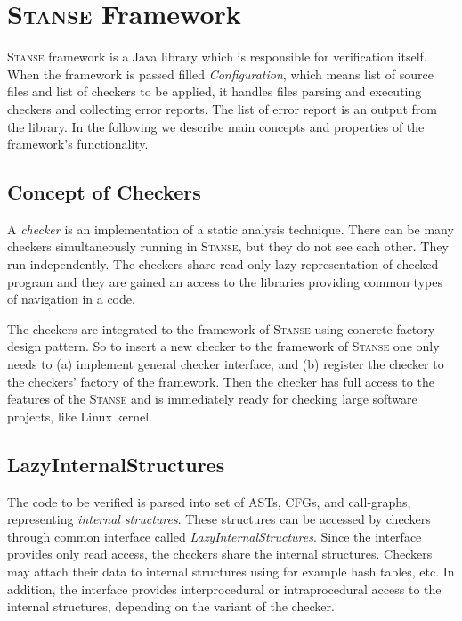 \documentclass[10pt]{llncs}
\newcommand{\Stanse}{\textsc{Stanse}\xspace}
\begin{document}
\section{\Stanse Framework}
\label{sec:framework}

\Stanse framework is a Java library which is responsible for verification itself. When the framework is passed filled \emph{Configuration}, which means list of source files and list of checkers to be applied, it handles files parsing and executing checkers and collecting error reports. The list of error report is an output from the library. In the following we describe main concepts and properties of the framework's functionality.

\subsection{Concept of Checkers}

A \emph{checker} is an implementation of a static analysis technique. There can be many checkers simultaneously running in \Stanse, but they do not see each other. They run independently. The checkers share read-only lazy representation of checked program and they are gained an access to the libraries providing common types of navigation in a code.

The checkers are integrated to the framework of \Stanse using concrete factory design pattern. So to insert a new checker to the framework of \Stanse one only needs to (a) implement general checker interface, and (b) register the checker
to the checkers' factory of the framework. Then the checker has full access to the features of the \Stanse and is immediately ready for checking large software projects, like Linux kernel.

\subsection{LazyInternalStructures}

The code to be verified is parsed into set of ASTs, CFGs, and call-graphs, representing \emph{internal structures}. These structures can be accessed by checkers through common interface called \emph{LazyInternalStructures}. Since the interface provides only read access, the checkers share the internal structures. Checkers may attach their data to internal structures using for example hash tables, etc. In addition, the interface provides interprocedural or intraprocedural access  to the internal structures, depending on the variant of the checker.
\end{document}
